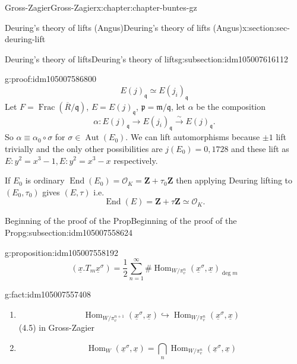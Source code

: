 \documentclass[oneside,10pt,]{book}
\numberwithin{equation}{section}
\newcommand{\ideal}[1]{\mathfrak{#1}}
\newcommand{\ZZ}{\mathbf{Z}}
\newcommand{\ints}{\mathcal{O}}
\DeclareMathOperator{\End}{End}
\DeclareMathOperator{\Hom}{Hom}
\DeclareMathOperator{\Aut}{Aut}
\DeclareMathOperator{\Frac}{Frac}
\begin{document}
\begin{chapterptx}{Gross-Zagier}{}{Gross-Zagier}{}{}{x:chapter:chapter-buntes-gz}
\begin{sectionptx}{Deuring's theory of lifts (Angus)}{}{Deuring's theory of lifts (Angus)}{}{}{x:section:sec-deuring-lift}
\begin{subsectionptx}{Deuring's theory of lifts}{}{Deuring's theory of lifts}{}{}{g:subsection:idm105007616112}
\begin{proofptx}{}{g:proof:idm105007586800}
\begin{equation*}
E(j)_{\ideal q} \simeq E(j_i)_{\ideal q}
\end{equation*}
Let \(F = \Frac (\overline R/\ideal q)\), \(E = E(j)_{\ideal q}\), \(\ideal p = \ideal m /\ideal q\), let \(\alpha \) be the composition%
\begin{equation*}
\alpha  \colon E(j)_{\ideal q} \to E(j_i)_{\ideal q} \xrightarrow\sim E(j)_{\ideal q}\text{.}
\end{equation*}
So \(\alpha  \equiv  \alpha _0 \circ \sigma\) for \(\sigma  \in \Aut(E_0)\). We can lift automorphisms because \(\pm1 \) lift trivially and the only other possibilities are \(j(E_0) = 0,1728\) and these lift as \(E\colon y^2 = x^3 - 1,E\colon y^2 = x^3-x\) respectively.%
\end{proofptx}
If \(E_0\) is ordinary \(\End(E_0) = \ints_K = \ZZ+ \tau _0\ZZ\) then applying Deuring lifting to \((E_0, \tau _0)\) gives \((E, \tau )\) i.e.%
\begin{equation*}
\End(E) = \ZZ+ \tau  \ZZ \simeq \ints_K\text{.}
\end{equation*}
%
\end{subsectionptx}
%
%
\typeout{************************************************}
\typeout{************************************************}
%
\begin{subsectionptx}{Beginning of the proof of the Prop}{}{Beginning of the proof of the Prop}{}{}{g:subsection:idm105007558624}
\begin{proposition}{}{}{g:proposition:idm105007558192}%
%
\begin{equation*}
(\underline x. T_m \underline x^\sigma ) = \frac12 \sum_{n=1}^\infty  \#\Hom_{W/\pi _v^n}(\underline x^\sigma , \underline x)_{\deg m}
\end{equation*}
%
\end{proposition}
\begin{fact}{}{}{g:fact:idm105007557408}%
%
\begin{enumerate}
\item{}%
\begin{equation*}
\Hom_{W/\pi _v^{n+1}}(\underline x^\sigma , \underline x) \hookrightarrow \Hom_{W/\pi _v^n}(\underline x^\sigma , \underline x)
\end{equation*}
(4.5) in Gross-Zagier%
\item{}%
\begin{equation*}
\Hom_{W}(\underline x^\sigma , \underline x) = \bigcap_n \Hom_{W/\pi _v^n}(\underline x^\sigma , \underline x)

\end{equation*}
\end{enumerate}
\end{fact}
\end{subsectionptx}
\end{sectionptx}
\end{chapterptx}
\end{document}
